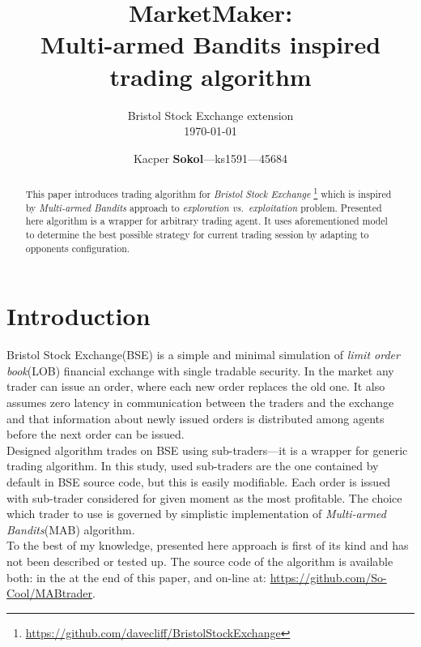 \documentclass{llncs}
\begin{document}
\title{MarketMaker:\\Multi-armed Bandits inspired trading algorithm}
\subtitle{Bristol Stock Exchange extension\\[1em]\today}
\author{Kacper \textbf{Sokol}---ks1591---45684}
%
\maketitle
%

\begin{abstract}
This paper introduces trading algorithm for \emph{Bristol Stock Exchange}%
\footnote{\url{https://github.com/davecliff/BristolStockExchange}} %
which is inspired by \emph{Multi-armed Bandits} approach to \emph{exploration vs.\ exploitation} problem. Presented here algorithm is a wrapper for arbitrary trading agent. It uses aforementioned model to determine the best possible strategy for current trading session by adapting to opponents configuration.
\end{abstract}

\section{Introduction}
Bristol Stock Exchange(BSE) is a simple and minimal simulation of \emph{limit order book}(LOB) financial exchange with single tradable security. In the market any trader can issue an order, where each new order replaces the old one. It also assumes zero latency in communication between the traders and the exchange and that information about newly issued orders is distributed among agents before the next order can be issued.\\

Designed algorithm trades on BSE using sub-traders---it is a wrapper for generic trading algorithm. In this study, used sub-traders are the one contained by default in BSE source code, but this is easily modifiable. Each order is issued with sub-trader considered for given moment as the most profitable. The choice which trader to use is governed by simplistic implementation of \emph{Multi-armed Bandits}(MAB) algorithm.\\

To the best of my knowledge, presented here approach is first of its kind and has not been described or tested up. The source code of the algorithm is available both: in the \emph{\appendixname} at the end of this paper, and on-line at: \url{https://github.com/So-Cool/MABtrader}.\\
\end{document}
